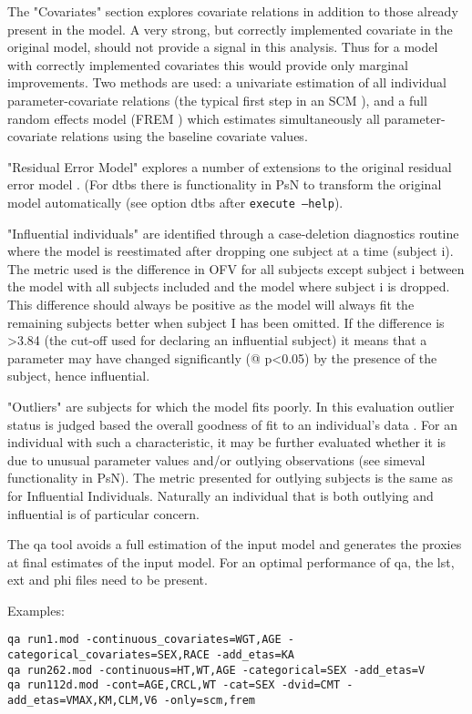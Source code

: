 The "Covariates" section explores covariate relations in addition to those already present in the model. A very strong, but correctly implemented covariate in the original model, should not provide a signal in this analysis. Thus for a model with correctly implemented covariates this would provide only marginal improvements. Two methods are used: a univariate estimation of all individual parameter-covariate relations (the typical first step in an SCM \cite{Jonsson2}), and a full random effects model (FREM \cite{Karlsson, Yun, Yngman}) which estimates simultaneously all parameter-covariate relations using the baseline covariate values.

"Residual Error Model" explores a number of extensions to the original residual error model \cite{Ibrahim, Karlsson2, Karlsson3, Dosne2012}. (For dtbs there is functionality in PsN to transform the original model automatically (see option dtbs after \verb|execute –help|). 

"Influential individuals" are identified through a case-deletion diagnostics routine where the model is reestimated after dropping one subject at a time (subject i). The metric used is the difference in OFV for all subjects except subject i between the model with all subjects included and the model where subject i is dropped. This difference should always be positive as the model will always fit the remaining subjects better when subject I has been omitted. If the difference is >3.84 (the cut-off used for declaring an influential subject) it means that a parameter may have changed significantly (@ p<0.05) by the presence of the subject, hence influential.

"Outliers" are subjects for which the model fits poorly. In this evaluation outlier status is judged based the overall goodness of fit to an individual's data \cite{Largajolli}. For an individual with such a characteristic, it may be further evaluated whether it is due to unusual parameter values and/or outlying observations (see simeval functionality in PsN). The metric presented for outlying subjects is the same as for Influential Individuals. Naturally an individual that is both outlying and influential is of particular concern.

The qa tool avoids a full estimation of the input model and generates the proxies at final estimates of the input model. For an optimal performance of qa, the lst, ext and phi files need to be present.
\newpage

Examples:
\begin{verbatim}
qa run1.mod -continuous_covariates=WGT,AGE -categorical_covariates=SEX,RACE -add_etas=KA
qa run262.mod -continuous=HT,WT,AGE -categorical=SEX -add_etas=V
qa run112d.mod -cont=AGE,CRCL,WT -cat=SEX -dvid=CMT -add_etas=VMAX,KM,CLM,V6 -only=scm,frem
\end{verbatim}

